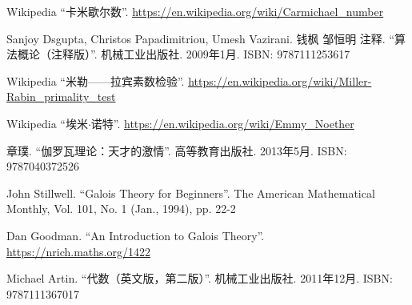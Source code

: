 \documentclass{article}
\begin{document}
\begin{thebibliography}{99}
Wikipedia ``卡米歇尔数''. \url{https://en.wikipedia.org/wiki/Carmichael_number}

Sanjoy Dsgupta, Christos Papadimitriou, Umesh Vazirani. 钱枫 邹恒明 注释. ``算法概论（注释版）''. 机械工业出版社. 2009年1月. ISBN: 9787111253617

Wikipedia ``米勒——拉宾素数检验''. \url{https://en.wikipedia.org/wiki/Miller-Rabin_primality_test}

Wikipedia ``埃米$\cdot$诺特''. \url{https://en.wikipedia.org/wiki/Emmy_Noether}

章璞. ``伽罗瓦理论：天才的激情''. 高等教育出版社. 2013年5月. ISBN: 9787040372526

John Stillwell. ``Galois Theory for Beginners''. The American Mathematical Monthly, Vol. 101, No. 1 (Jan., 1994), pp. 22-2

Dan Goodman. ``An Introduction to Galois Theory''. \url{https://nrich.maths.org/1422}

Michael Artin. ``代数（英文版，第二版）''. 机械工业出版社. 2011年12月. ISBN: 9787111367017

\end{thebibliography}

\expandafter\enddocument

\fi
\end{document}
